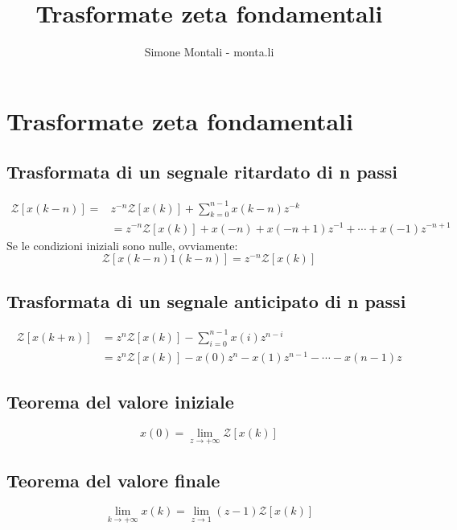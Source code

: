 \documentclass[11pt]{article}
\begin{document}
\author{Simone Montali - monta.li}
\title{Trasformate zeta fondamentali}

\maketitle

\medskip
\section{Trasformate zeta fondamentali}
\subsection{Trasformata di un segnale ritardato di n passi}
\begin{displaymath}
    \begin{aligned}
        \mathcal{Z}[x(k-n)]= & z^{-n} \mathcal{Z}[x(k)]+\sum_{k=0}^{n-1} x(k-n) z^{-k}              \\
                             & =z^{-n} \mathcal{Z}[x(k)]+x(-n)+x(-n+1) z^{-1}+\cdots+x(-1) z^{-n+1}
    \end{aligned}
\end{displaymath}
Se le condizioni iniziali sono nulle, ovviamente:
\begin{displaymath}
    \mathcal{Z}[x(k-n) 1(k-n)]=z^{-n} \mathcal{Z}[x(k)]
\end{displaymath}
\subsection{Trasformata di un segnale anticipato di n passi}
\begin{displaymath}
    \begin{aligned}
        \mathcal{Z}[x(k+n)] & =z^{n} \mathcal{Z}[x(k)]-\sum_{i=0}^{n-1} x(i) z^{n-i}           \\
                            & =z^{n} \mathcal{Z}[x(k)]-x(0) z^{n}-x(1) z^{n-1}-\cdots-x(n-1) z
    \end{aligned}
\end{displaymath}
\subsection{Teorema del valore iniziale}
\begin{displaymath}
    x(0)=\lim _{z \rightarrow+\infty} \mathcal{Z}[x(k)]
\end{displaymath}
\subsection{Teorema del valore finale}
\begin{displaymath}
    \lim _{k \rightarrow+\infty} x(k)=\lim _{z \rightarrow 1}(z-1) \mathcal{Z}[x(k)]
\end{displaymath}
\end{document}
